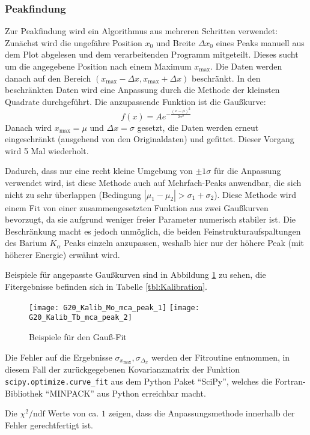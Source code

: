 \documentclass{../Misc/MontavonLaTeX/Montavon}
\newcommand{\halfwidth}{0.48\textwidth}
\begin{document}
\subsubsection{Peakfindung}
\label{sec:Peakfindung}
Zur Peakfindung wird ein Algorithmus aus mehreren Schritten verwendet:
Zunächst wird die ungefähre Position $x_0$ und Breite $\Delta x_0$ eines Peaks manuell aus dem Plot abgelesen und dem verarbeitenden Programm mitgeteilt. Dieses sucht um die angegebene Position nach einem Maximum $x_\textrm{max}$. 
Die Daten werden danach auf den Bereich $(x_\textrm{max} - \Delta x, x_\textrm{max} + \Delta x)$ beschränkt.
In den beschränkten Daten wird eine Anpassung durch die Methode der kleinsten Quadrate durchgeführt. Die anzupassende Funktion ist die Gaußkurve:
\[
	f(x) = A e^{-\frac{(x-\mu)^2}{2 \sigma^2}}
\]
Danach wird $x_\textrm{max} = \mu$ und $\Delta x = \sigma$ gesetzt, die Daten werden erneut eingeschränkt (ausgehend von den Originaldaten) und gefittet.
Dieser Vorgang wird 5 Mal wiederholt. 

Dadurch, dass nur eine recht kleine Umgebung von $\pm 1 \sigma$ für die Anpassung verwendet wird,  ist diese Methode auch auf Mehrfach-Peaks anwendbar, die sich nicht zu sehr überlappen (Bedingung $|\mu_1 - \mu_2| > \sigma_1 + \sigma_2$). Diese Methode wird einem Fit von einer zusammengesetzten Funktion aus zwei Gaußkurven bevorzugt, da sie aufgrund weniger freier Parameter numerisch stabiler ist. Die Beschränkung macht es jedoch unmöglich, die beiden Feinstrukturaufspaltungen des Barium $K_\alpha$ Peaks einzeln anzupassen, weshalb hier nur der höhere Peak (mit höherer Energie) erwähnt wird.

Beispiele für angepasste Gaußkurven sind in Abbildung \ref{fig:GaussFit} zu sehen, die Fitergebnisse befinden sich in Tabelle \ref{tbl:Kalibration}.

\begin{figure}[htbp]
\texttt{[image: G20\_Kalib\_Mo\_mca\_peak\_1]}
\texttt{[image: G20\_Kalib\_Tb\_mca\_peak\_2]}
\caption{Beispiele für den Gauß-Fit}
\label{fig:GaussFit}
\end{figure}

Die Fehler auf die Ergebnisse $\sigma_{x_\textrm{max}}, \sigma_{\Delta_x}$ werden der Fitroutine entnommen, in diesem Fall der zurückgegebenen Kovarianzmatrix der Funktion \texttt{scipy.optimize.curve\_fit} aus dem Python Paket \enquote{SciPy}, welches die Fortran-Bibliothek \enquote{MINPACK} aus Python erreichbar macht.

Die $\chi^2/\textrm{ndf}$ Werte von ca. $1$ zeigen, dass die Anpassungsmethode innerhalb der Fehler gerechtfertigt ist.
\end{document}
